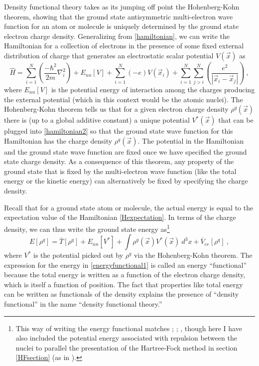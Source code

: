 \documentclass[onecolumn,secnumarabic,amsmath,amssymb,balancelastpage,nofootinbib]{article}
\begin{document}
Density functional theory takes as its jumping off point the Hohenberg-Kohn theorem, showing that the ground state antisymmetric multi-electron wave function for an atom or molecule is uniquely determined by the ground state electron charge density.  Generalizing from \eqref{hamiltonian}, we can write the Hamiltonian for a collection of electrons in the presence of some fixed external distribution of charge that generates an electrostatic scalar potential $V(\vec{x})$ as
\begin{equation}
\widehat{H}= \sum_{i=1}^{N}\left(\frac{-\hbar^2}{2 m} \nabla_i^2 \right)  + E_{nn}[V] + \sum_{i=1}^{N}(-e)V(\vec{x}_i) + \sum_{i=1}^{N}\sum_{j>i}^{N}\left(\frac{e^2}{|\vec{x}_i-\vec{x}_j|}\right)
\ ,
\label{hamiltonian2}
\end{equation}
where $E_{nn}[V]$ is the potential energy of interaction among the charges producing the external potential (which in this context would be the atomic nuclei).  The Hohenberg-Kohn theorem tells us that for a given electron charge density $\rho^q(\vec{x})$ there is (up to a global additive constant) a unique potential $V^*(\vec{x})$ that can be plugged into \eqref{hamiltonian2} so that the ground state wave function for this Hamiltonian has the charge density $\rho^q(\vec{x})$.  The potential in the Hamiltonian and the ground state wave function are fixed once we have specified the ground state charge density.  As a consequence of this theorem, any property of the ground state that is fixed by the multi-electron wave function (like the total energy or the kinetic energy) can alternatively be fixed by specifying the charge density.

Recall that for a ground state atom or molecule, the actual energy is equal to the expectation value of the Hamiltonian \eqref{Hexpectation}.  In terms of the charge density, we can thus write the ground state energy as\footnote{This way of writing the energy functional matches \cite[eq.\ 3.2.3]{parryang}; \cite[eq.\ 9.36]{atkins2011}; \cite[eq.\ 16.36]{levineQC}, though here I have also included the potential energy associated with repulsion between the nuclei to parallel the presentation of the Hartree-Fock method in section \ref{HFsection} (as in \cite[eq.\ 6.12]{martin2004}).}
\begin{equation}
E[\rho^q]=\overline{T}[\rho^q]+E_{nn}[V^*]+\int{\rho^q(\vec{x}) V^*(\vec{x}) \  d^3 x}+\overline{V}_{ee}[\rho^q]
\ ,
\label{energyfunctional1}
\end{equation}
where $V^*$ is the potential picked out by $\rho^q$ via the Hohenberg-Kohn theorem.  The expression for the energy in \eqref{energyfunctional1} is called an energy ``functional'' because the total energy is written as a function of the electron charge density, which is itself a function of position.  The fact that properties like total energy can be written as functionals of the density explains the presence of ``density functional'' in the name ``density functional theory.''
\end{document}
